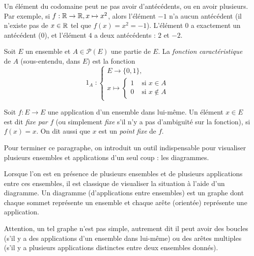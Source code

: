 \begin{exemple} Un élément du codomaine peut ne pas avoir d'antécédents, ou en avoir plusieurs. Par exemple, si $f : \mathbb{R}\to \mathbb{R}, x\mapsto x^2$, alors l'élément $-1$ n'a aucun antécédent (il n'existe pas de $x\in \mathbb{R}$ tel que $f(x)=x^2=-1$). L'élément $0$ a exactement un antécédent ($0$), et l'élément $4$ a deux antécédents : $2$ et $-2$.
\end{exemple}

\begin{definition}
Soit $E$ un ensemble et $A\in \mathcal P(E)$ une partie de $E$. La \emph{fonction caractéristique} de $A$ (sous-entendu, dans $E$) est la fonction 
\[
\operatorname{1}_A :\begin{cases}E \to \{0,1\},\\ x\mapsto \begin{cases}1&\text{ si } x\in A\\0&\text{ si } x\not\in A\end{cases}\end{cases}
\]
\end{definition}

\begin{definition}
Soit $f : E\to E$ une application d'un ensemble dans lui-même. Un élément $x\in E$ est dit \emph{fixe par $f$} (ou simplement \emph{fixe} s'il n'y a pas d'ambiguïté sur la fonction), si $f(x)=x$. On dit aussi que $x$ est un \emph{point fixe} de $f$.
\end{definition}

Pour terminer ce paragraphe, on introduit un outil indispensable pour visualiser plusieurs ensembles et applications d'un seul coup : les diagrammes.

\begin{definition}[Diagramme]
Lorsque l'on est en présence de plusieurs ensembles et de plusieurs applications entre ces ensembles, il est classique de visualiser la situation à l'aide d'un diagramme. Un diagramme (d'applications entre ensembles) est un graphe dont chaque sommet représente un ensemble et chaque arête (orientée) représente une application.
\end{definition}

Attention, un tel graphe n'est pas simple, autrement dit il peut avoir des boucles (s'il y a des applications d'un ensemble dans lui-même) ou des arêtes multiples (s'il y a plusieurs applications distinctes entre deux ensembles donnés).

